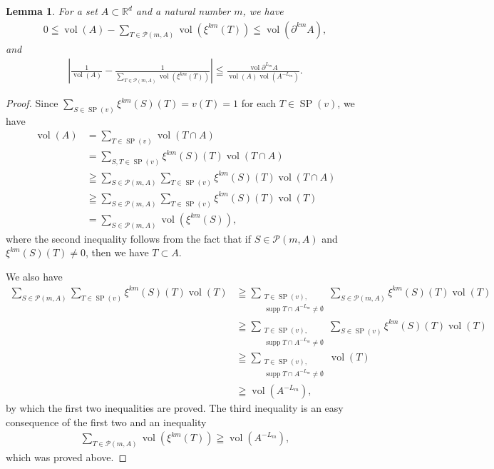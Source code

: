 \documentclass[a4]{amsart}
\DeclareMathOperator{\supp}{supp}
\DeclareMathOperator{\vol}{vol}
\DeclareMathOperator{\SP}{SP}
\newtheorem{lem}[theorem]{Lemma}
\theoremstyle{definition}
\begin{document}
\begin{lem}\label{lem2_appendix}
 For a set $A\subset\mathbb{R}^d$ and a natural number $m$, we have
\begin{align*}
 0\leqq\vol(A)-\sum_{T\in\mathcal{P}(m,A)}\vol(\xi^{km}(T))\leqq\vol(\partial^{km}A),
\end{align*}
and
\begin{align*}
 \left|\frac{1}{\vol(A)}-\frac{1}{\sum_{T\in\mathcal{P}(m,A)}\vol(\xi^{km}(T))}\right|
\leqq \frac{\vol\partial^{L_m}A}{\vol(A)\vol(A^{-L_m})}.
\end{align*}
\end{lem}
\begin{proof}
 Since $\sum_{S\in\SP(v)}\xi^{km}(S)(T)=v(T)=1$ for each $T\in\SP(v)$, we have
\begin{align*}
 \vol(A)&=\sum_{T\in\SP(v)}\vol(T\cap A)\\
&=\sum_{S,T\in\SP(v)}\xi^{km}(S)(T)\vol(T\cap A)\\
&\geqq\sum_{S\in\mathcal{P}(m,A)}\sum_{T\in\SP(v)}\xi^{km}(S)(T)\vol(T\cap A)\\
&\geqq\sum_{S\in\mathcal{P}(m,A)}\sum_{T\in\SP(v)}\xi^{km}(S)(T)\vol(T)\\
&=\sum_{S\in\mathcal{P}(m,A)}\vol(\xi^{km}(S)),
\end{align*}
where the second inequality follows from the fact that if 
$S\in\mathcal{P}(m,A)$ and $\xi^{km}(S)(T)\neq 0$, then we have $T\subset A$.

We also have
\begin{align*}
 \sum_{S\in\mathcal{P}(m,A)}\sum_{T\in\SP(v)}\xi^{km}(S)(T)\vol(T)
&\geqq\sum_{\substack{T\in\SP(v),\\\supp T\cap A^{-L_m}\neq \emptyset}}
\sum_{S\in\mathcal{P}(m,A)}\xi^{km}(S)(T)\vol(T)\\
&\geqq\sum_{\substack{T\in\SP(v),\\\supp T\cap A^{-L_m}\neq \emptyset}}
\sum_{S\in\SP(v)}\xi^{km}(S)(T)\vol(T)\\
&\geqq\sum_{\substack{T\in\SP(v),\\\supp T\cap A^{-L_m}\neq \emptyset}}\vol(T)\\
&\geqq\vol(A^{-L_m}),
\end{align*}
by which the first two inequalities are proved.
The third inequality is an easy consequence of the first two and an inequality
\begin{align*}
 \sum_{T\in\mathcal{P}(m,A)}\vol(\xi^{km}(T))\geqq\vol(A^{-L_m}),
\end{align*}
which was proved above.
\end{proof}
\end{document}
